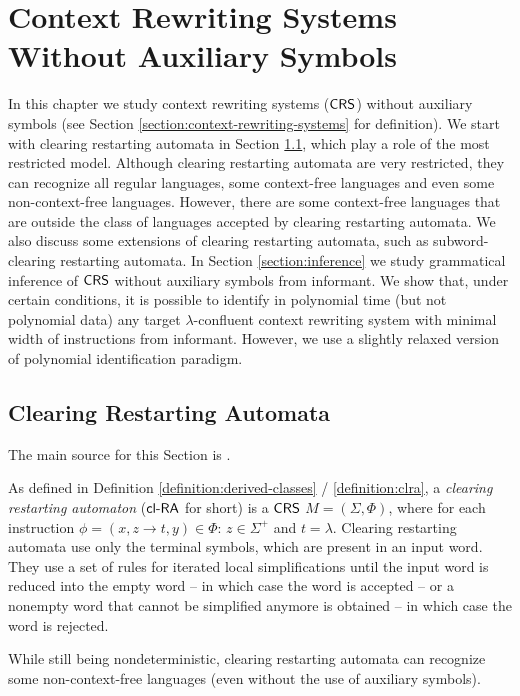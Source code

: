 \chapter{Context Rewriting Systems Without Auxiliary Symbols}\label{chapter:crs_nonaux}

In this chapter we study context rewriting systems ($\textup{\sf CRS\/}$) without auxiliary symbols (see Section \ref{section:context-rewriting-systems} for definition). We start with clearing restarting automata in Section \ref{section:clra}, which play a role of the most restricted model. Although clearing restarting automata are very restricted, they can recognize all regular languages, some context-free languages and even some non-context-free languages. However, there are some context-free languages that are outside the class of languages accepted by clearing restarting automata. We also discuss some extensions of clearing restarting automata, such as subword-clearing restarting automata. In Section \ref{section:inference} we study grammatical inference of $\textup{\sf CRS\/}$ without auxiliary symbols from informant. We show that, under certain conditions, it is possible to identify in polynomial time (but not polynomial data) any target $\lambda$-confluent context rewriting system with minimal width of instructions from informant. However, we use a slightly relaxed version of polynomial identification paradigm.

\section{Clearing Restarting Automata}\label{section:clra}

The main source for this Section is \cite{C10Diploma, CM10}.

As defined in Definition \ref{definition:derived-classes} / \ref{definition:clra}, a \emph{clearing restarting automaton} \cite{CM10} (\emph{$\textup{\sf cl-RA\/}$} for short) is a $\textup{\sf CRS\/}$ $M = (\Sigma, \Phi)$, where for each instruction $\phi = (x, z \to t, y) \in \Phi$: $z \in \Sigma^+$ and $t = \lambda$. Clearing restarting automata use only the terminal symbols, which are present in an input word. They use a set of rules for iterated local simplifications until the input word is reduced into the empty word -- in which case the word is accepted -- or a nonempty word that cannot be simplified anymore is obtained -- in which case the word is rejected.

While still being nondeterministic, clearing restarting automata can recognize some non-context-free languages (even without the use of auxiliary symbols).

